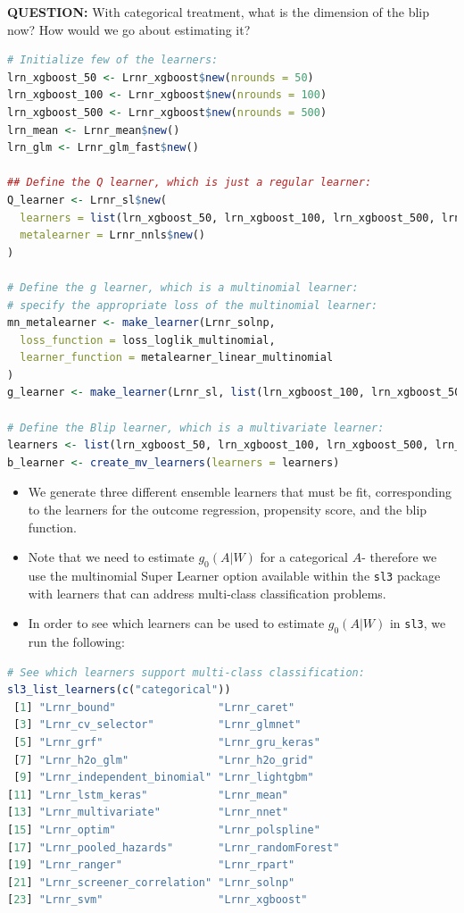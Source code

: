 \documentclass[
  12pt, krantz2,
]{book}
\newcommand{\passthrough}[1]{#1}
\theoremstyle{definition}
\theoremstyle{definition}
\theoremstyle{definition}
\newcommand{\1}{\mathbbm{1}}
\begin{document}
\textbf{QUESTION:} With categorical treatment, what is the dimension of the blip now?
How would we go about estimating it?

\begin{lstlisting}[language=R]
# Initialize few of the learners:
lrn_xgboost_50 <- Lrnr_xgboost$new(nrounds = 50)
lrn_xgboost_100 <- Lrnr_xgboost$new(nrounds = 100)
lrn_xgboost_500 <- Lrnr_xgboost$new(nrounds = 500)
lrn_mean <- Lrnr_mean$new()
lrn_glm <- Lrnr_glm_fast$new()

## Define the Q learner, which is just a regular learner:
Q_learner <- Lrnr_sl$new(
  learners = list(lrn_xgboost_50, lrn_xgboost_100, lrn_xgboost_500, lrn_mean, lrn_glm),
  metalearner = Lrnr_nnls$new()
)

# Define the g learner, which is a multinomial learner:
# specify the appropriate loss of the multinomial learner:
mn_metalearner <- make_learner(Lrnr_solnp,
  loss_function = loss_loglik_multinomial,
  learner_function = metalearner_linear_multinomial
)
g_learner <- make_learner(Lrnr_sl, list(lrn_xgboost_100, lrn_xgboost_500, lrn_mean), mn_metalearner)

# Define the Blip learner, which is a multivariate learner:
learners <- list(lrn_xgboost_50, lrn_xgboost_100, lrn_xgboost_500, lrn_mean, lrn_glm)
b_learner <- create_mv_learners(learners = learners)
\end{lstlisting}

\begin{itemize}
\item
  We generate three different ensemble learners that must be fit,
  corresponding to the learners for the outcome regression, propensity score, and the
  blip function.
\item
  Note that we need to estimate \(g_0(A|W)\) for a categorical \(A\)- therefore
  we use the multinomial Super Learner option available within the \passthrough{\lstinline!sl3!} package with learners
  that can address multi-class classification problems.
\item
  In order to see which learners can
  be used to estimate \(g_0(A|W)\) in \passthrough{\lstinline!sl3!}, we run the following:
\end{itemize}

\begin{lstlisting}[language=R]
# See which learners support multi-class classification:
sl3_list_learners(c("categorical"))
 [1] "Lrnr_bound"                "Lrnr_caret"               
 [3] "Lrnr_cv_selector"          "Lrnr_glmnet"              
 [5] "Lrnr_grf"                  "Lrnr_gru_keras"           
 [7] "Lrnr_h2o_glm"              "Lrnr_h2o_grid"            
 [9] "Lrnr_independent_binomial" "Lrnr_lightgbm"            
[11] "Lrnr_lstm_keras"           "Lrnr_mean"                
[13] "Lrnr_multivariate"         "Lrnr_nnet"                
[15] "Lrnr_optim"                "Lrnr_polspline"           
[17] "Lrnr_pooled_hazards"       "Lrnr_randomForest"        
[19] "Lrnr_ranger"               "Lrnr_rpart"               
[21] "Lrnr_screener_correlation" "Lrnr_solnp"               
[23] "Lrnr_svm"                  "Lrnr_xgboost"             
\end{lstlisting}
\end{document}
